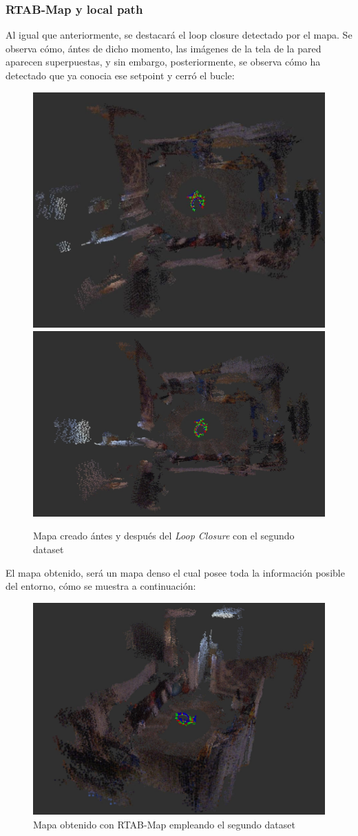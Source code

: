\subsubsection{RTAB-Map y local path}
Al igual que anteriormente, se destacará el loop closure detectado por el mapa. Se observa cómo, ántes de dicho momento, las imágenes de la tela de la pared aparecen superpuestas,
y sin embargo, posteriormente, se observa cómo ha detectado que ya conocia ese setpoint y cerró el bucle:
\begin{figure}[h!]
    \centering
    \includegraphics[width=.4\textwidth]{images/slam/bag3_rtabmap_noLC}
    \includegraphics[width=.51\textwidth]{images/slam/bag3_rtabmap_LC}
    \caption{Mapa creado ántes y después del \textit{Loop Closure} con el segundo dataset}
\end{figure}

El mapa obtenido, será un mapa denso el cual posee toda la información posible del entorno, cómo se muestra a continuación:

\begin{figure}[h!]
    \centering
    \includegraphics[width=.7\textwidth]{images/slam/bag3_rtabmapbonito}
    \caption{Mapa obtenido con RTAB-Map empleando el segundo dataset}
\end{figure}
    
